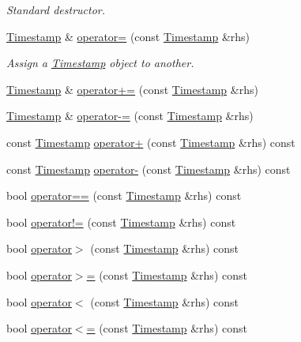 \begin{DoxyCompactItemize}
\begin{DoxyCompactList}\small\item\em Standard destructor. \end{DoxyCompactList}\item 
\hyperlink{class_timestamp}{Timestamp} \& \hyperlink{class_timestamp_ae97a897474c2a0b3c14b96c21bcddb12}{operator=} (const \hyperlink{class_timestamp}{Timestamp} \&rhs)
\begin{DoxyCompactList}\small\item\em Assign a \hyperlink{class_timestamp}{Timestamp} object to another. \end{DoxyCompactList}\item 
\hyperlink{class_timestamp}{Timestamp} \& \hyperlink{class_timestamp_a75b30341805c05e8875b9f0caaaa5f1d}{operator+=} (const \hyperlink{class_timestamp}{Timestamp} \&rhs)
\item 
\hyperlink{class_timestamp}{Timestamp} \& \hyperlink{class_timestamp_ad8ac2cf2eebb081ba04f61f1663373f7}{operator-\/=} (const \hyperlink{class_timestamp}{Timestamp} \&rhs)
\item 
const \hyperlink{class_timestamp}{Timestamp} \hyperlink{class_timestamp_a8a2196e9f83869e3c4c13eae0b610353}{operator+} (const \hyperlink{class_timestamp}{Timestamp} \&rhs) const 
\item 
const \hyperlink{class_timestamp}{Timestamp} \hyperlink{class_timestamp_a92f658880325e560dca3b96f21f13be4}{operator-\/} (const \hyperlink{class_timestamp}{Timestamp} \&rhs) const 
\item 
bool \hyperlink{class_timestamp_ab3aeec868b34b270b40dde4d0154b3ae}{operator==} (const \hyperlink{class_timestamp}{Timestamp} \&rhs) const 
\item 
bool \hyperlink{class_timestamp_ad64979a3dc3387f1feb1cf76a1e001bf}{operator!=} (const \hyperlink{class_timestamp}{Timestamp} \&rhs) const 
\item 
bool \hyperlink{class_timestamp_a317c3ee11406c668d30aaf27651e1237}{operator$>$} (const \hyperlink{class_timestamp}{Timestamp} \&rhs) const 
\item 
bool \hyperlink{class_timestamp_a88f7835430f39681c59400736f83a4b9}{operator$>$=} (const \hyperlink{class_timestamp}{Timestamp} \&rhs) const 
\item 
bool \hyperlink{class_timestamp_a2f0739b9dd635edba62c42cea65c387b}{operator$<$} (const \hyperlink{class_timestamp}{Timestamp} \&rhs) const 
\item 
bool \hyperlink{class_timestamp_a63e2e0474bbe971c2db2ab726408d203}{operator$<$=} (const \hyperlink{class_timestamp}{Timestamp} \&rhs) const 

\end{DoxyCompactItemize}
